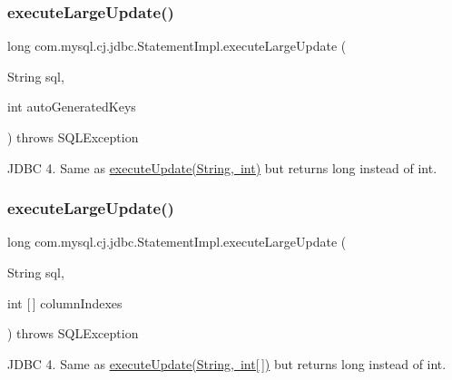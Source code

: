 \subsubsection{\texorpdfstring{execute\+Large\+Update()}{executeLargeUpdate()}\hspace{0.1cm}{\footnotesize\ttfamily [2/4]}}
{\footnotesize\ttfamily long com.\+mysql.\+cj.\+jdbc.\+Statement\+Impl.\+execute\+Large\+Update (\begin{DoxyParamCaption}\item[{String}]{sql,  }\item[{int}]{auto\+Generated\+Keys }\end{DoxyParamCaption}) throws S\+Q\+L\+Exception}

J\+D\+BC 4. Same as \mbox{\hyperlink{classcom_1_1mysql_1_1cj_1_1jdbc_1_1_statement_impl_a17446c85d153a1456965eb64858b5f46}{execute\+Update(\+String, int)}} but returns long instead of int. \mbox{\label{classcom_1_1mysql_1_1cj_1_1jdbc_1_1_statement_impl_a80eeb600ed30f4f2dc7ea99891e594b1}} 
\subsubsection{\texorpdfstring{execute\+Large\+Update()}{executeLargeUpdate()}\hspace{0.1cm}{\footnotesize\ttfamily [3/4]}}
{\footnotesize\ttfamily long com.\+mysql.\+cj.\+jdbc.\+Statement\+Impl.\+execute\+Large\+Update (\begin{DoxyParamCaption}\item[{String}]{sql,  }\item[{int \mbox{[}$\,$\mbox{]}}]{column\+Indexes }\end{DoxyParamCaption}) throws S\+Q\+L\+Exception}

J\+D\+BC 4. Same as \mbox{\hyperlink{}{execute\+Update(\+String, int\mbox{[}$\,$\mbox{]})}} but returns long instead of int. \mbox{\label{classcom_1_1mysql_1_1cj_1_1jdbc_1_1_statement_impl_ac8be77a2303189e5efa1c5c9d34d0962}} 
